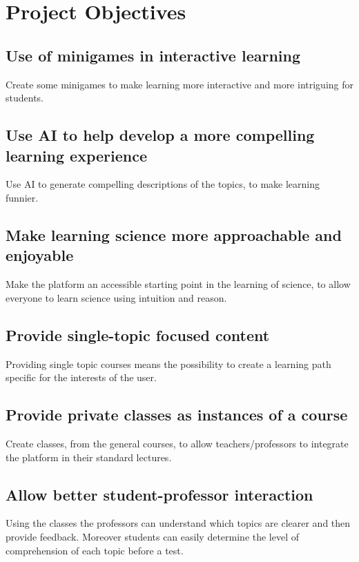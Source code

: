 \section{Project Objectives} \label{project-objectives}

\subsection{Use of minigames in interactive learning}

Create some minigames to make learning more interactive and more intriguing for students.

\subsection{Use AI to help develop a more compelling learning experience}

Use AI to generate compelling descriptions of the topics, to make learning funnier.

\subsection{Make learning science more approachable and enjoyable}

Make the platform an accessible starting point in the learning of science, to allow everyone to learn science using intuition and reason.

\subsection{Provide single-topic focused content}

Providing single topic courses means the possibility to create a learning path specific for the interests of the user.

\subsection{Provide private classes as instances of a course}

Create classes, from the general courses, to allow teachers/professors to integrate the platform in their standard lectures.

\subsection{Allow better student-professor interaction}

Using the classes the professors can understand which topics are clearer and then provide feedback. Moreover students can easily determine the level of comprehension of each topic before a test.

